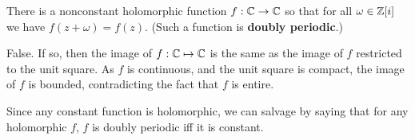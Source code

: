 \documentclass{homework}
\begin{document}
                                                                                                                                                                                                                                                                                              \begin{problem}\label{doubly-periodic}There is a nonconstant holomorphic function $f : \mathbb{C} \to \mathbb{C}$ so that
                                                                                                                                                                                                                                                                                                for all $\omega \in \mathbb{Z}[i]$ we have $f(z + \omega) = f(z)$.  (Such a
                                                                                                                                                                                                                                                                                                  function is \textbf{doubly periodic}.)
                                                                                                                                                                                                                                                                                                  \end{problem}
                                                                                                                                                                                                                                                                                                  \begin{solution}
                                                                                                                                                                                                                                                                                                  False. If so, then the image of $f:\mathbb{C} \mapsto \mathbb{C}$ is the same as the image of $f$ restricted to the unit square. As $f$ is continuous, and the unit square is compact, the image of $f$ is bounded, contradicting the fact that $f$ is entire.

                                                                                                                                                                                                                                                                                                  Since any constant function is holomorphic, we can salvage by saying that for any holomorphic $f$, $f$ is doubly periodic iff it is constant.
                                                                                                                                                                                                                                                                                                  \end{solution}
\end{document}
